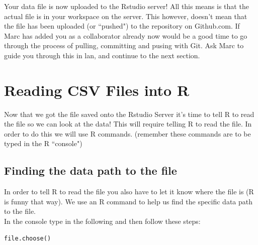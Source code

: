 \documentclass{article}\usepackage[]{graphicx}\usepackage[]{color}
\begin{document}
Your data file is now uploaded to the Rstudio server! All this means is that the actual file is in your workspace on the server. This however, doesn't mean that the file has been uploaded (or ``pushed") to the repository on Github.com. If Marc has added you as a collaborator already now would be a good time to go through the process of pulling, committing and pusing with Git. Ask Marc to guide you through this in lan, and continue to the next section. 





\section{Reading CSV Files into R}

Now that we got the file saved onto the Rstudio Server it's time to tell R to read the file so we can look at the data! This will require telling R to read the file. In order to do this we will use R commands. (remember these commands are to be typed in the R ``console") %

 \subsection{Finding the data path to the file}
In order to tell R to read the file you also have to let it know where the file is (R is funny that way). We use an R command to help us find the specific data path to the file. \\
In the console type in the following and then follow these steps: 
\begin{verbatim}
file.choose()
\end{verbatim}
\end{document}
